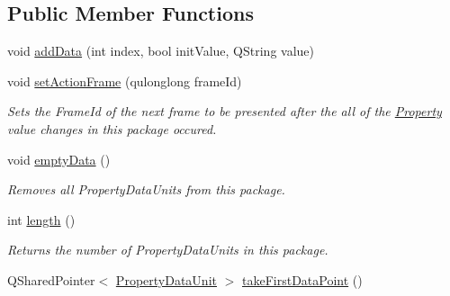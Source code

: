 \subsection*{Public Member Functions}
\begin{DoxyCompactItemize}
\item 
void \hyperlink{class_picto_1_1_property_data_unit_package_a12ef4e6031cd72983eb8bc1852348644}{add\-Data} (int index, bool init\-Value, Q\-String value)
\item 
\hypertarget{class_picto_1_1_property_data_unit_package_a081a469852fb0f1ef067d3a869847b24}{void \hyperlink{class_picto_1_1_property_data_unit_package_a081a469852fb0f1ef067d3a869847b24}{set\-Action\-Frame} (qulonglong frame\-Id)}\label{class_picto_1_1_property_data_unit_package_a081a469852fb0f1ef067d3a869847b24}

\begin{DoxyCompactList}\small\item\em Sets the Frame\-Id of the next frame to be presented after the all of the \hyperlink{class_picto_1_1_property}{Property} value changes in this package occured. \end{DoxyCompactList}\item 
\hypertarget{class_picto_1_1_property_data_unit_package_aeaa257fd15fd58b3cc60676dd9510cf4}{void \hyperlink{class_picto_1_1_property_data_unit_package_aeaa257fd15fd58b3cc60676dd9510cf4}{empty\-Data} ()}\label{class_picto_1_1_property_data_unit_package_aeaa257fd15fd58b3cc60676dd9510cf4}

\begin{DoxyCompactList}\small\item\em Removes all Property\-Data\-Units from this package. \end{DoxyCompactList}\item 
\hypertarget{class_picto_1_1_property_data_unit_package_af96cb3d01ff412b3f5b756d35db4a393}{int \hyperlink{class_picto_1_1_property_data_unit_package_af96cb3d01ff412b3f5b756d35db4a393}{length} ()}\label{class_picto_1_1_property_data_unit_package_af96cb3d01ff412b3f5b756d35db4a393}

\begin{DoxyCompactList}\small\item\em Returns the number of Property\-Data\-Units in this package. \end{DoxyCompactList}\item 
\hypertarget{class_picto_1_1_property_data_unit_package_ac67a0d2f58370071f12284f0d8309675}{Q\-Shared\-Pointer$<$ \hyperlink{class_picto_1_1_property_data_unit}{Property\-Data\-Unit} $>$ \hyperlink{class_picto_1_1_property_data_unit_package_ac67a0d2f58370071f12284f0d8309675}{take\-First\-Data\-Point} ()}\label{class_picto_1_1_property_data_unit_package_ac67a0d2f58370071f12284f0d8309675}


\end{DoxyCompactItemize}
